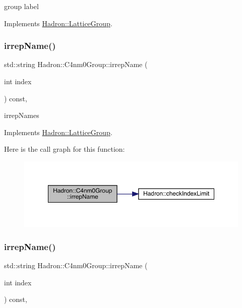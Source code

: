 group label 

Implements \mbox{\hyperlink{structHadron_1_1LatticeGroup_a82208a322bf1b1db489f16af38e70087}{Hadron\+::\+Lattice\+Group}}.

\mbox{\label{structHadron_1_1C4nm0Group_ae7e7c420d17cacaed69a74902af72dcc}} 
\subsubsection{\texorpdfstring{irrepName()}{irrepName()}\hspace{0.1cm}{\footnotesize\ttfamily [1/3]}}
{\footnotesize\ttfamily std\+::string Hadron\+::\+C4nm0\+Group\+::irrep\+Name (\begin{DoxyParamCaption}\item[{int}]{index }\end{DoxyParamCaption}) const\hspace{0.3cm}{\ttfamily [inline]}, {\ttfamily [virtual]}}

irrep\+Names 

Implements \mbox{\hyperlink{structHadron_1_1LatticeGroup_a4bc5620218c2a73157e19bc4451fe746}{Hadron\+::\+Lattice\+Group}}.

Here is the call graph for this function\+:
\nopagebreak
\begin{figure}[H]
\begin{center}
\leavevmode
\includegraphics[width=350pt]{da/da1/structHadron_1_1C4nm0Group_ae7e7c420d17cacaed69a74902af72dcc_cgraph}
\end{center}
\end{figure}
\mbox{\label{structHadron_1_1C4nm0Group_ae7e7c420d17cacaed69a74902af72dcc}} 
\subsubsection{\texorpdfstring{irrepName()}{irrepName()}\hspace{0.1cm}{\footnotesize\ttfamily [2/3]}}
{\footnotesize\ttfamily std\+::string Hadron\+::\+C4nm0\+Group\+::irrep\+Name (\begin{DoxyParamCaption}\item[{int}]{index }\end{DoxyParamCaption}) const\hspace{0.3cm}{\ttfamily [inline]}, {\ttfamily [virtual]}}

